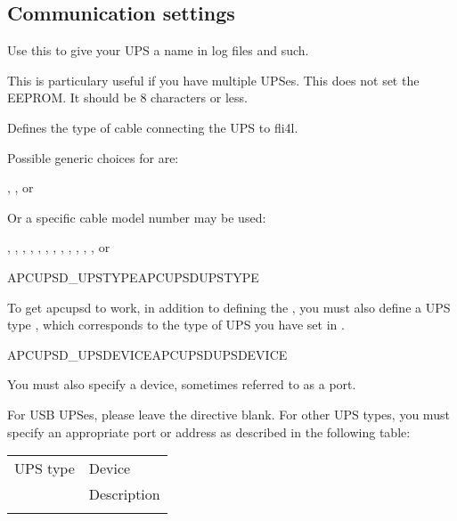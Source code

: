 \subsection {Communication settings}
\begin{description}


  Use this to give your UPS a name in log files and such.
  
  This is particulary useful if you have multiple UPSes. This does not
  set the EEPROM. It should be 8 characters or less.


 
  Defines the type of cable connecting the UPS to fli4l.
   
  Possible generic choices for  are:
 
   , ,  or 
  
  Or a specific cable model number may be used:  

  , , , ,
  , , , ,
  , , , ,
  or 

 {APCUPSD\_UPSTYPE}{APCUPSDUPSTYPE}

  To get apcupsd to work, in addition to defining the 
  ,
  you must also define a UPS type , which corresponds to
  the type of UPS you have set in 
  . 

 {APCUPSD\_UPSDEVICE}{APCUPSDUPSDEVICE}

  You must also specify a device, sometimes referred to as a port.
  
  For USB UPSes, please leave the  directive blank. 
  For other UPS types, you must specify an appropriate port or address as 
  described in the following table:
   
\begin{tabular}{p{20mm}p{120mm}}
  UPS type & Device \\ & Description
  \\\\ 
  

\end{tabular}
\end{description}
